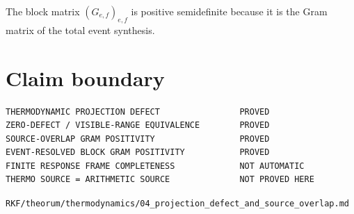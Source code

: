 The block matrix \((G_{e,f})_{e,f}\) is positive semidefinite because it is the Gram matrix of the total event synthesis.

\hypertarget{claim-boundary}{%
\section{Claim boundary}\label{claim-boundary}}

\begin{verbatim}
THERMODYNAMIC PROJECTION DEFECT                PROVED
ZERO-DEFECT / VISIBLE-RANGE EQUIVALENCE        PROVED
SOURCE-OVERLAP GRAM POSITIVITY                 PROVED
EVENT-RESOLVED BLOCK GRAM POSITIVITY           PROVED
FINITE RESPONSE FRAME COMPLETENESS             NOT AUTOMATIC
THERMO SOURCE = ARITHMETIC SOURCE              NOT PROVED HERE
\end{verbatim}

\begin{flushright}\small\texttt{RKF/theorum/thermodynamics/04\_projection\_defect\_and\_source\_overlap.md}\end{flushright}
